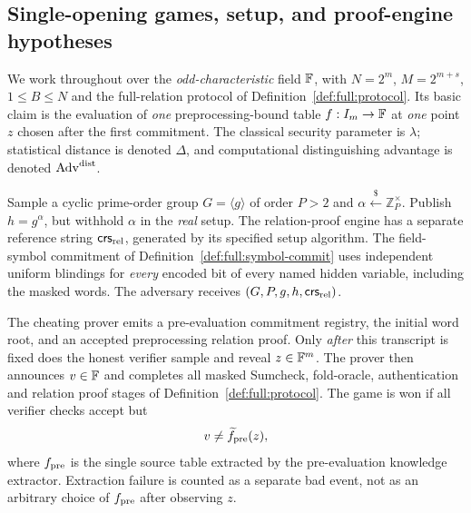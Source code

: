 \subsection{Single-opening games, setup, and proof-engine hypotheses}\label{sec:security14:games}
We work throughout over the \emph{odd-characteristic} field
$\mathbb{F}$, with $N=2^m$, $M=2^{m+s}$, $1\le B\le N$
and the full-relation protocol of
Definition~\ref{def:full:protocol}.
Its basic claim is the evaluation of \emph{one}
preprocessing-bound table $f:I_m\to\mathbb{F}$ at \emph{one}
point $z$ chosen after the first commitment.
The classical security parameter is $\lambda$;
statistical distance is denoted $\Delta$, and
computational distinguishing advantage is denoted
$\operatorname{Adv}^{\rm dist}$.

\begin{definition}\label{def:security14:setup}
Sample a cyclic prime-order group $G=\langle g\rangle$
of order $P>2$ and
$\alpha\overset{\$}{\leftarrow}\mathbb Z_P^\times$.
Publish $h=g^\alpha$, but withhold $\alpha$ in
the \emph{real} setup. The relation-proof engine
has a separate reference string
$\mathsf{crs}_{\rm rel}$, generated by its
specified setup algorithm.
The field-symbol commitment of
Definition~\ref{def:full:symbol-commit}
uses independent uniform blindings for
\emph{every} encoded bit of every named
hidden variable, including the masked words.
The adversary receives $(G,P,g,h,
\mathsf{crs}_{\rm rel})$.
\end{definition}

\begin{definition}\label{def:security14:binding-game}
The cheating prover emits a pre-evaluation
commitment registry, the initial word root,
and an accepted preprocessing relation proof.
Only \emph{after} this transcript is fixed
does the honest verifier sample and reveal
$z\in\mathbb{F}^m$.
The prover then announces $v\in\mathbb{F}$
and completes all masked Sumcheck,
fold-oracle, authentication and relation
proof stages of
Definition~\ref{def:full:protocol}.
The game is won if all verifier checks
accept but
\[
 v\neq\widetilde f_{\rm pre}(z),
\]
where $f_{\rm pre}$ is the single source
table extracted by the pre-evaluation
knowledge extractor.
Extraction failure is counted as a
separate bad event, not as an arbitrary
choice of $f_{\rm pre}$ after observing $z$.
\end{definition}

